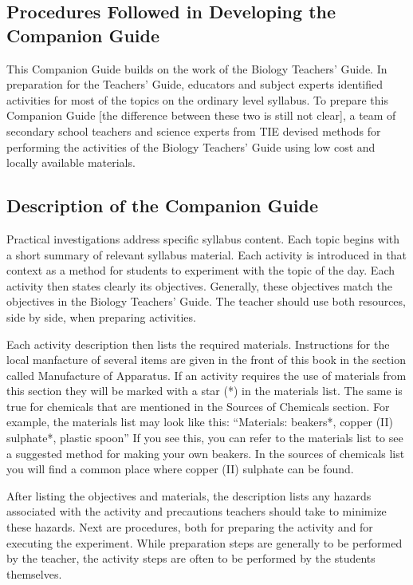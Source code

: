 \subsection{Procedures Followed in Developing the Companion Guide}

This Companion Guide builds on the work of the Biology Teachers' Guide. In preparation for the Teachers' Guide, educators and subject experts identified activities for most of the topics on the ordinary level syllabus. To prepare this Companion Guide [the difference between these two is still not clear], a team of secondary school teachers and science experts from TIE devised methods for performing the activities of the Biology Teachers' Guide using low cost and locally available materials.

\subsection{Description of the Companion Guide}

Practical investigations address specific syllabus content. Each topic begins with a short summary of relevant syllabus material. Each activity is introduced in that context as a method for students to experiment with the topic of the day. Each activity then states clearly its objectives. Generally, these objectives match the objectives in the Biology Teachers' Guide. The teacher should use both resources, side by side, when preparing activities.

Each activity description then lists the required materials. Instructions for the local manfacture of several items are given in the front of this book in the section called Manufacture of Apparatus. If an activity requires the use of materials from this section they will be marked with a star (*) in the materials list. The same is true for chemicals that are mentioned in the Sources of Chemicals section. For example, the materials list may look like this:
``Materials: beakers*, copper (II) sulphate*, plastic spoon''
If you see this, you can refer to the materials list to see a suggested method for making your own beakers. In the sources of chemicals list you will find a common place where copper (II) sulphate can be found. 

After listing the objectives and materials, the description lists any hazards associated with the activity and precautions teachers should take to minimize these hazards. Next are procedures, both for preparing the activity and for executing the experiment. While preparation steps are generally to be performed by the teacher, the activity steps are often to be performed by the students themselves.

